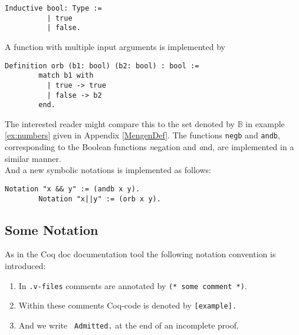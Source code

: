 	    \label{Def:booleans}
	    \begin{lstlisting}[caption= \lstinline!bool!]    
	    Inductive bool: Type :=
	      | true
	      | false.
	    \end{lstlisting}
	     A function with multiple input arguments is implemented by
	    \begin{lstlisting}[caption = \lstinline!orb!, label = lst:orb]
	    Definition orb (b1: bool) (b2: bool) : bool :=
	    match b1 with
		  | true -> true
		  | false -> b2
	    end.
	    \end{lstlisting}  
	    The interested reader might compare this to the set denoted by $\mathbb{B}$ in example \ref{ex:numbers} given in Appendix \ref{MengenDef}.
	    The functions \lstinline!negb! and \lstinline!andb!, corresponding to the Boolean functions {\emph negation} and {\emph and}, are implemented in a similar manner.\\   
	    And a new symbolic notations is implemented as follows:
	    \begin{lstlisting}[caption= introducing a new notation]
	    Notation "x && y" := (andb x y).
	    Notation "x||y" := (orb x y).
	    \end{lstlisting}
	    
	\subsection{Some Notation}
	\label{subsec:someNotation}
	    As in the Coq doc documentation tool the following notation convention is introduced:
	     
	    \begin{enumerate}
	     \item In \texttt{.v-files} comments are annotated by \lstinline!(* some comment *)!. 
	     \item Within these comments Coq-code is denoted by \lstinline![example].! 
	     \item And we write \lstinline! Admitted.! at the end of an incomplete proof.    
	     \end{enumerate}
	     
